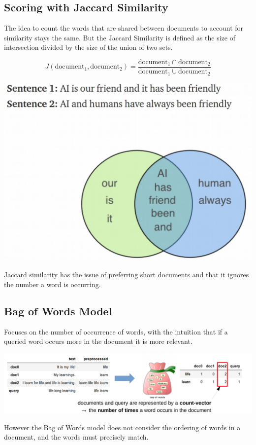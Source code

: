 \documentclass[11pt]{article}
\begin{document}
\subsection{Scoring with Jaccard Similarity}
The idea to count the words that are shared between documents to account for similarity stays the same. But the Jaccard Similarity is defined as the size of intersection divided by the size of the union of two sets.

\noindent
\begin{minipage}{0.55\linewidth}
	\begin{equation*}
	J(\text{document}_1,\text{document}_2) = \frac{\text{document}_1\cap\text{document}_2}{\text{document}_1\cup\text{document}_2}
	\end{equation*}
\end{minipage}
\begin{minipage}{0.4\linewidth}
	\begin{center}
		\includegraphics[width=0.9\linewidth]{img/jaccard_set}
	\end{center}
\end{minipage}
Jaccard similarity has the issue of preferring short documents and that it ignores the number a word is occurring.

\subsection{Bag of Words Model}
Focuses on the number of occurrence of words, with the intuition that if a queried word occurs more in the document it is more relevant.
\begin{center}
	\includegraphics[width=0.8\linewidth]{img/bagofwords_model}
\end{center}
However the Bag of Words model does not consider the ordering of words in a document, and the words must precisely match.
\end{document}
